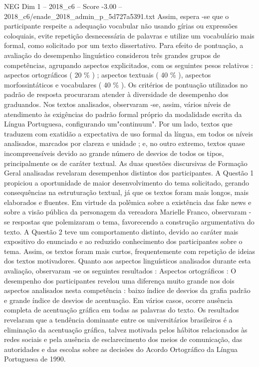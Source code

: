 \begin{textsample}{NEG Dim 1 – 2018\_c6 – Score -3.00 – 2018\_c6/enade\_2018\_admin\_p\_5d727a5391.txt}
Assim, espera -se que o participante respeite a adequação vocabular não usando gírias ou expressões coloquiais, evite repetição desnecessária de palavras e utilize um vocabulário mais formal, como solicitado por um texto dissertativo.
Para efeito de pontuação, a avaliação do desempenho linguístico considerou três grandes grupos de competências, agrupando aspectos explicitados, com os seguintes pesos relativos : aspectos ortográficos ( 20 \% ) ; aspectos textuais ( 40 \% ), aspectos morfossintáticos e vocabulares ( 40 \% ).
Os critérios de pontuação utilizados no padrão de resposta procuraram atender à diversidade de desempenho dos graduandos.
Nos textos analisados, observaram -se, assim, vários níveis de atendimento às exigências do padrão formal próprio da modalidade escrita da Língua Portuguesa, configurando um"continuum".
Por um lado, textos que traduzem com exatidão a expectativa de uso formal da língua, em todos os níveis analisados, marcados por clareza e unidade ; e, no outro extremo, textos quase incompreensíveis devido ao grande número de desvios de todos os tipos, principalmente os de caráter textual.
As duas questões discursivas de Formação Geral analisadas revelaram desempenhos distintos dos participantes.
A Questão 1 propiciou a oportunidade de maior desenvolvimento do tema solicitado, gerando consequências na estruturação textual, já que os textos foram mais longos, mais elaborados e fluentes.
Em virtude da polêmica sobre a existência das fake news e sobre a visão pública da personagem da vereadora Marielle Franco, observaram -se respostas que polemizaram o tema, favorecendo a construção argumentativa do texto.
A Questão 2 teve um comportamento distinto, devido ao caráter mais expositivo do enunciado e ao reduzido conhecimento dos participantes sobre o tema.
Assim, os textos foram mais curtos, frequentemente com repetição de ideias dos textos motivadores.
Quanto aos aspectos linguísticos analisados durante esta avaliação, observaram -se os seguintes resultados : Aspectos ortográficos : O desempenho dos participantes revelou uma diferença muito grande nos dois aspectos analisados nesta competência : baixo índice de desvios da grafia padrão e grande índice de desvios de acentuação.
Em vários casos, ocorre ausência completa de acentuação gráfica em todas as palavras do texto.
Os resultados revelaram que a tendência dominante entre os universitários brasileiros é a eliminação da acentuação gráfica, talvez motivada pelos hábitos relacionados às redes sociais e pela ausência de esclarecimento dos meios de comunicação, das autoridades e das escolas sobre as decisões do Acordo Ortográfico da Língua Portuguesa de 1990.

\end{textsample}
